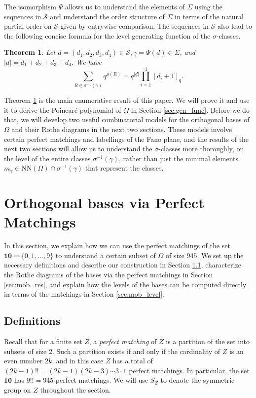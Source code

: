 \documentclass[10pt,a4paper]{amsart}
\newtheorem{theorem}{Theorem}[section]
\numberwithin{equation}{section}
\newcommand{\seqd}{\underline{d}}
\newcommand{\cals}{\mathcal{S}}
\newcommand{\ten}{\mathbf{10}}
\newcommand{\ob}{\Omega}
\newcommand{\nn}{\mathrm{NN}}
\newcommand{\inverse}{^{-1}}
\newcommand{\abs}[1]{\lvert #1 \rvert}
\begin{document}
The isomorphism $\Psi$ allows us to understand the elements of $\Sigma$ using
the sequences in $\cals$ and understand the order structure of $\Sigma$ in terms
of the natural partial order on $\cals$ given by entrywise comparison. The
sequences in $\cals$ also lead to the following concise formula for the level
generating function of the $\sigma$-classes.

\begin{theorem}
\label{thm:gen_func}
Let $\seqd=(d_1,d_2,d_3,d_4)\in \cals, \gamma=\Psi(\seqd)\in \Sigma$, and
$\abs{\seqd}=d_1+d_2+d_3+d_4$. We have
\[
  \sum_{R\in \sigma\inverse(\gamma)}q^{\rho(R)}=q^{\abs{\seqd}}\prod_{i=1}^4 
  [d_i+1]_q.
\]
\end{theorem}

Theorem \ref{thm:gen_func} is the main enumerative result of this paper. We will
prove it and use it to derive the Poincar\'e polynomial of $\ob$ in Section
\ref{sec:gen_func}. Before we do that, we will develop two useful combinatorial
models for the orthogonal bases of $\ob$ and their Rothe diagrams in the next two
sections. These models involve certain perfect matchings and labellings of the
Fano plane, and the results of the next two sections will allow us to understand
the $\sigma$-classes more thoroughly, on the level of the entire classes
$\sigma\inverse(\gamma)$, rather than just the minimal elements $m_\gamma\in
\nn(\ob)\cap \sigma\inverse(\gamma)$ that represent the classes.


\section{Orthogonal bases via Perfect Matchings}
\label{sec:mob}

In this section, we explain how we can use the perfect matchings of the set
$\ten = \{0, 1, ..., 9\}$ to understand a certain subset of $\ob$ of
size $945$. We set up the necessary definitions and describe our construction in
Section \ref{sec:mob_def}, characterize the Rothe diagrams of the bases via the
perfect matchings in Section \ref{sec:mob_res}, and explain how the levels of
the bases can be computed directly in terms of the matchings in Section
\ref{sec:mob_level}.

\subsection{Definitions}
\label{sec:mob_def}
Recall that for a finite set $Z$, a \emph{perfect matching} of $Z$ is a partition of
the set into subsets of size 2. Such a partition exists if and only
if the cardinality of $Z$ is an even number $2k$, and in this case 
$Z$ has a total of $(2k-1)!!=(2k-1)(2k-3)\cdots 3\cdot 1$
perfect matchings. In particular, the set $\ten$ has $9!!=945$ perfect matchings. 
We will use $S_Z$ to denote the symmetric group on
$Z$ throughout the section.
\end{document}
